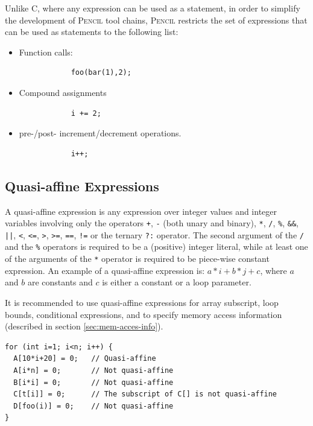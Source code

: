 \documentclass{carp}
\newcommand\pencil{\textsc{Pencil}\xspace}
\begin{document}
Unlike C, where any expression can be used as a statement, in
order to simplify the development of \pencil tool chains, \pencil
restricts the set of expressions that can be used as statements
to the following list:
\begin{itemize}
    \item Function calls:
        \begin{lstlisting}
            foo(bar(1),2);
        \end{lstlisting}
    \item Compound assignments
        \begin{lstlisting}
            i += 2;
        \end{lstlisting}
    \item pre-/post- increment/decrement operations.
        \begin{lstlisting}
            i++;
        \end{lstlisting}
\end{itemize}


\subsection{Quasi-affine Expressions}
\label{sec:quasi-affine}

A quasi-affine expression is any expression over integer values and
integer variables involving only the operators \lstinline{+},
\lstinline{-} (both unary and binary), \lstinline{*}, \lstinline{/},
\lstinline{%}, \lstinline{&&}, \lstinline{||}, \lstinline{<}, \lstinline{<=},
\lstinline{>}, \lstinline{>=}, \lstinline{==}, \lstinline{!=} or the
ternary \lstinline{?:} operator.  The second argument of the
\lstinline{/} and the \lstinline{%}
operators is required to be a (positive) integer literal, while at
least one of the arguments of the \lstinline{*} operator is
required to be piece-wise constant expression. An example of a
quasi-affine expression is: $a*i+b*j+c$, where $a$ and $b$ are
constants and $c$ is either a constant or a loop parameter.

It is recommended to use quasi-affine expressions for
array subscript, loop bounds, conditional expressions,
and to specify memory access information (described in
section \ref{sec:mem-acces-info}).

\begin{lstlisting}[language=pencil]
for (int i=1; i<n; i++) {
  A[10*i+20] = 0;	// Quasi-affine
  A[i*n] = 0;		// Not quasi-affine
  B[i*i] = 0;		// Not quasi-affine
  C[t[i]] = 0;		// The subscript of C[] is not quasi-affine
  D[foo(i)] = 0;	// Not quasi-affine
}
\end{lstlisting}
\end{document}
